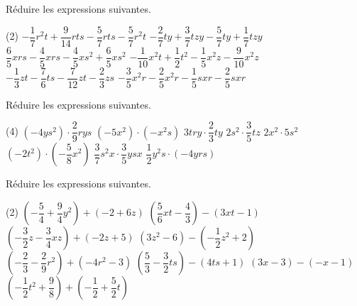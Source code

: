 \documentclass[a4paper,12pt]{report}
\begin{document}
\begin{auto}Réduire les expressions suivantes.

\begin{tasks}(2)
	\task $-\dfrac{1}{7} r^2 t + \dfrac{9}{14} r t s-\dfrac{5}{7} r t s-\dfrac{5}{7} r^2 t$
	\task $-\dfrac{2}{7} t y + \dfrac{3}{7} t z y-\dfrac{5}{7} t y + \dfrac{1}{7} t z y$
	\task $\dfrac{6}{5} x r s-\dfrac{4}{5} x r s-\dfrac{4}{5} x s^2 + \dfrac{6}{5} x s^2$
	\task $-\dfrac{1}{10} x^2 t + \dfrac{1}{2} t^2-\dfrac{1}{5} x^2 z-\dfrac{9}{10} x^2 z$
	\task $-\dfrac{1}{3} z t-\dfrac{7}{6} t s-\dfrac{7}{12} z t-\dfrac{2}{3} z s$
	\task $-\dfrac{3}{5} x^2 r-\dfrac{2}{5} x^2 r-\dfrac{1}{5} s x r-\dfrac{2}{5} s x r$
\end{tasks}
\end{auto}

\begin{auto}Réduire les expressions suivantes.

\begin{tasks}(4)
	\task $\left(-4 y s^2\right) \cdot \dfrac{2}{9} r y s$
	\task $\left(-5 x^2\right) \cdot \left(-x^2 s\right)$
	\task $3 t r y \cdot \dfrac{2}{3} t y$
	\task $2 s^2 \cdot \dfrac{3}{5} t z$
	\task $2 x^2 \cdot 5 s^2$
	\task $\left(-2 t^2\right) \cdot \left(-\dfrac{5}{8} x^2\right)$
	\task $\dfrac{3}{7} s^2 x \cdot \dfrac{3}{5} y s x$
	\task $\dfrac{1}{2} y^2 s \cdot \left(-4 y r s\right)$
\end{tasks}
\end{auto}

\begin{auto}Réduire les expressions suivantes.

\begin{tasks}(2)
	\task $\left(-\dfrac{5}{4}  + \dfrac{9}{4} y^2\right)+\left(-2  + 6 z\right)$
	\task $\left(\dfrac{5}{6} x t-\dfrac{4}{3} \right)-\left(3 x t-1\right)$
	\task $\left(-\dfrac{3}{2} z-\dfrac{3}{4} x z\right)+\left(-2 z + 5 \right)$
	\task $\left(3 z^2-6 \right)-\left(-\dfrac{1}{2} z^2 + 2 \right)$
	\task $\left(-\dfrac{2}{3} -\dfrac{2}{9} r^2\right)+\left(-4 r^2-3 \right)$
	\task $\left(\dfrac{5}{3} -\dfrac{3}{2} t s\right)-\left(4 t s + 1\right)$
	\task $\left(3 x-3 \right)-\left(-x-1\right)$
	\task $\left(-\dfrac{1}{2} t^2 + \dfrac{9}{8} \right)+\left(-\dfrac{1}{2}  + \dfrac{5}{2} t\right)$
\end{tasks}
\end{auto}
\end{document}
